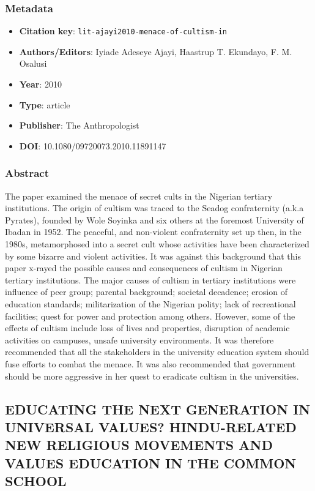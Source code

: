 \subsubsection*{Metadata}
\begin{itemize}
  \item \textbf{Citation key}: \texttt{lit-ajayi2010-menace-of-cultism-in}
  \item \textbf{Authors/Editors}: Iyiade Adeseye Ajayi, Haastrup T. Ekundayo, F. M. Osalusi
  \item \textbf{Year}: 2010
  \item \textbf{Type}: article
  \item \textbf{Publisher}: The Anthropologist
  \item \textbf{DOI}: 10.1080/09720073.2010.11891147
\end{itemize}
\subsubsection*{Abstract}
The paper examined the menace of secret cults in the Nigerian tertiary institutions. The origin of cultism was traced to the Seadog confraternity (a.k.a Pyrates), founded by Wole Soyinka and six others at the foremost University of Ibadan in 1952. The peaceful, and non-violent confraternity set up then, in the 1980s, metamorphosed into a secret cult whose activities have been characterized by some bizarre and violent activities. It was against this background that this paper x-rayed the possible causes and consequences of cultism in Nigerian tertiary institutions. The major causes of cultism in tertiary institutions were influence of peer group; parental background; societal decadence; erosion of education standards; militarization of the Nigerian polity; lack of recreational facilities; quest for power and protection among others. However, some of the effects of cultism include loss of lives and properties, disruption of academic activities on campuses, unsafe university environments. It was therefore recommended that all the stakeholders in the university education system should fuse efforts to combat the menace. It was also recommended that government should be more aggressive in her quest to eradicate cultism in the universities.

\subsection{EDUCATING THE NEXT GENERATION IN UNIVERSAL VALUES? HINDU-RELATED NEW RELIGIOUS MOVEMENTS AND VALUES EDUCATION IN THE COMMON SCHOOL}\label{lit:lit-arweck2013-educating-the-next-generation}
